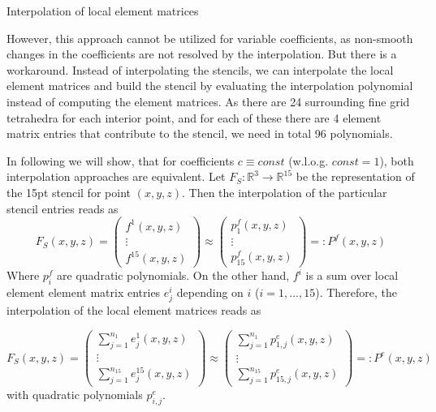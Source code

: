 \documentclass[a4paper,11pt,reqno]{amsart}
\numberwithin{figure}{section}
\numberwithin{table}{section}
\def\RR{\mathbb{R}}
\begin{document}
\newpage
\begin{section}{Interpolation of local element matrices}
\label{sec:interpolationLocElementMat}

However, this approach cannot be utilized for variable coefficients, as non-smooth
changes in the coefficients are not resolved by the interpolation. But there is a 
workaround. Instead of interpolating the stencils, we can interpolate the local 
element matrices and build the stencil by evaluating the interpolation polynomial
instead of computing the element matrices. As there are 24 surrounding fine grid
tetrahedra for each interior point, and for each of these there are 4 element matrix
entries that contribute to the stencil, we need in total 96 polynomials.

In following we will show, that for coefficients $c\equiv const$ (w.l.o.g. $const = 1$),
both interpolation approaches are equivalent.
Let $F_S : \RR^3 \rightarrow \RR^{15}$ be the representation of the 15pt stencil
for point $(x,y,z)$. Then the interpolation of the particular stencil entries reads
as
\begin{equation}
\label{eq:interpolationStencil}
F_S(x,y,z) = 
\begin{pmatrix}
f^1(x,y,z) \\
\vdots \\
f^{15}(x,y,z)
\end{pmatrix}
\approx
\begin{pmatrix}
p^f_1(x,y,z) \\
\vdots \\
p^f_{15}(x,y,z)
\end{pmatrix}
=: P^f(x,y,z)
\end{equation}
Where $p^f_i$ are quadratic polynomials.
On the other hand, $f^i$ is a sum over local element element matrix entries 
$e_j^i$ depending on $i$ ($i = 1,...,15$). 
Therefore, the interpolation of the local element matrices reads as

\begin{equation}
\label{eq:interpolationLocStiffness}
F_S(x,y,z) = 
\begin{pmatrix}
\sum_{j=1}^{n_1}e_j^1(x,y,z) \\
\vdots \\
\sum_{j=1}^{n_{15}}e_j^{15}(x,y,z) 
\end{pmatrix}
\approx
\begin{pmatrix}
\sum_{j=1}^{n_1}p_{1,j}^e(x,y,z)  \\
\vdots \\
\sum_{j=1}^{n_{15}}p_{15,j}^e(x,y,z) 
\end{pmatrix}
=: P^e(x,y,z)
\end{equation}
with quadratic polynomials $p^e_{i,j}$.


\end{section}
\end{document}
